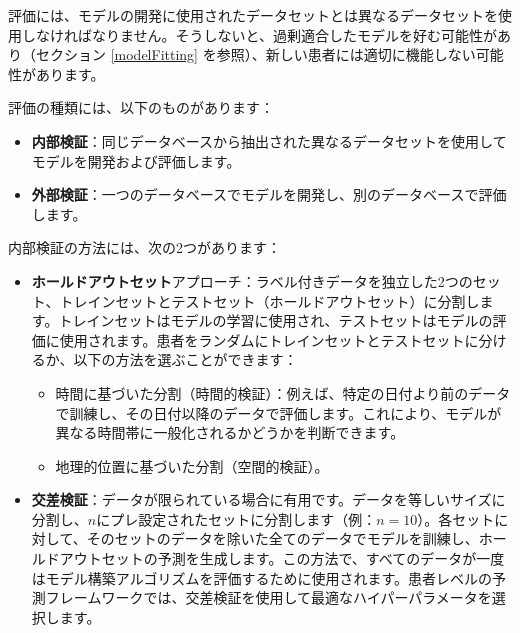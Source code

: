 \documentclass[
  11pt]{book}
\makeatletter
\providecommand{\tightlist}{%
  \setlength{\itemsep}{0pt}\setlength{\parskip}{0pt}}
\newenvironment{kframe}{%
\medskip{}
\setlength{\fboxsep}{.8em}
 \def\at@end@of@kframe{}%
 \ifinner\ifhmode%
  \def\at@end@of@kframe{\end{minipage}}%
  \begin{minipage}{\columnwidth}%
 \fi\fi%
 \def\FrameCommand##1{\hskip\@totalleftmargin \hskip-\fboxsep
 \colorbox{myShadeColor}{##1}\hskip-\fboxsep
     \hskip-\linewidth \hskip-\@totalleftmargin \hskip\columnwidth}%
 \MakeFramed {\advance\hsize-\width
   \@totalleftmargin\z@ \linewidth\hsize
   \@setminipage}}%
 {\par\unskip\endMakeFramed%
 \at@end@of@kframe}
\newenvironment{rmdblock}[1]
  {
  \begin{itemize}
  \renewcommand{\labelitemi}{
    \raisebox{-.7\height}[0pt][0pt]{
      {\setkeys{Gin}{width=3em,keepaspectratio}\texttt{[image: images/\#1]}}
    }
  }
  \setlength{\fboxsep}{1em}
  \begin{kframe}
  \item
  }
  {
  \end{kframe}
  \end{itemize}
  }
\newenvironment{rmdimportant}
  {\begin{rmdblock}{important}}
  {\end{rmdblock}}
\theoremstyle{definition}
\theoremstyle{definition}
\theoremstyle{definition}
\theoremstyle{definition}
\theoremstyle{remark}
\makeatother
\begin{document}
\begin{rmdimportant}
評価には、モデルの開発に使用されたデータセットとは異なるデータセットを使用しなければなりません。そうしないと、過剰適合したモデルを好む可能性があり（セクション \ref{modelFitting} を参照）、新しい患者には適切に機能しない可能性があります。
\end{rmdimportant}

評価の種類には、以下のものがあります：

\begin{itemize}
\tightlist
\item
  \textbf{内部検証}：同じデータベースから抽出された異なるデータセットを使用してモデルを開発および評価します。
\item
  \textbf{外部検証}：一つのデータベースでモデルを開発し、別のデータベースで評価します。  
\end{itemize}

内部検証の方法には、次の2つがあります：

\begin{itemize}
\tightlist
\item
  \textbf{ホールドアウトセット}アプローチ：ラベル付きデータを独立した2つのセット、トレインセットとテストセット（ホールドアウトセット）に分割します。トレインセットはモデルの学習に使用され、テストセットはモデルの評価に使用されます。患者をランダムにトレインセットとテストセットに分けるか、以下の方法を選ぶことができます：

  \begin{itemize}
  \tightlist
  \item
    時間に基づいた分割（時間的検証）：例えば、特定の日付より前のデータで訓練し、その日付以降のデータで評価します。これにより、モデルが異なる時間帯に一般化されるかどうかを判断できます。
  \item
    地理的位置に基づいた分割（空間的検証）。 
  \end{itemize}
\item
  \textbf{交差検証}：データが限られている場合に有用です。データを等しいサイズに分割し、\(n\)にプレ設定されたセットに分割します（例：\(n=10\)）。各セットに対して、そのセットのデータを除いた全てのデータでモデルを訓練し、ホールドアウトセットの予測を生成します。この方法で、すべてのデータが一度はモデル構築アルゴリズムを評価するために使用されます。患者レベルの予測フレームワークでは、交差検証を使用して最適なハイパーパラメータを選択します。 
\end{itemize}
\end{document}
